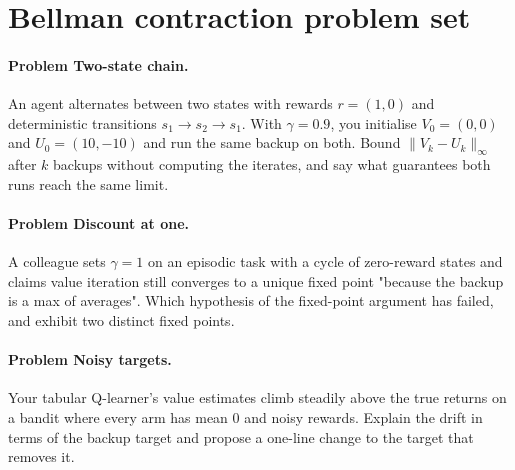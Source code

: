 \documentclass{article}
\newenvironment{problem}[1][]{\paragraph{Problem #1.}}{}
\begin{document}
\section{Bellman contraction problem set}

\begin{problem}[Two-state chain]
An agent alternates between two states with rewards $r = (1, 0)$ and deterministic transitions $s_1 \to s_2 \to s_1$.
With $\gamma = 0.9$, you initialise $V_0 = (0, 0)$ and $U_0 = (10, -10)$ and run the same backup on both.
Bound $\|V_k - U_k\|_\infty$ after $k$ backups without computing the iterates, and say what guarantees both runs reach the same limit.
\end{problem}

\begin{problem}[Discount at one]
A colleague sets $\gamma = 1$ on an episodic task with a cycle of zero-reward states and claims value iteration still converges to a unique fixed point
"because the backup is a max of averages". Which hypothesis of the fixed-point argument has failed, and exhibit two distinct fixed points.
\end{problem}

\begin{problem}[Noisy targets]
Your tabular Q-learner's value estimates climb steadily above the true returns on a bandit where every arm has mean $0$ and noisy rewards.
Explain the drift in terms of the backup target and propose a one-line change to the target that removes it.
\end{problem}
\end{document}
